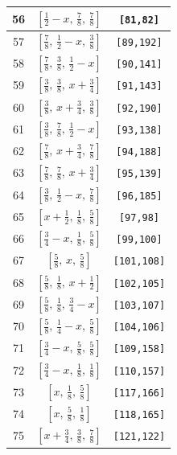 \documentclass[fleqn,8pt]{jsarticle}
\begin{document}
\begin{longtable}{ccc}
56 & $\left[ \frac{1}{2} - x,\, \frac{7}{8},\, \frac{7}{8} \right]$ & {\tt [81,82]} \\ \hline
57 & $\left[ \frac{7}{8},\, \frac{1}{2} - x,\, \frac{3}{8} \right]$ & {\tt [89,192]} \\ \hline
58 & $\left[ \frac{7}{8},\, \frac{3}{8},\, \frac{1}{2} - x \right]$ & {\tt [90,141]} \\ \hline
59 & $\left[ \frac{3}{8},\, \frac{3}{8},\, x + \frac{3}{4} \right]$ & {\tt [91,143]} \\ \hline
60 & $\left[ \frac{3}{8},\, x + \frac{3}{4},\, \frac{3}{8} \right]$ & {\tt [92,190]} \\ \hline
61 & $\left[ \frac{3}{8},\, \frac{7}{8},\, \frac{1}{2} - x \right]$ & {\tt [93,138]} \\ \hline
62 & $\left[ \frac{7}{8},\, x + \frac{3}{4},\, \frac{7}{8} \right]$ & {\tt [94,188]} \\ \hline
63 & $\left[ \frac{7}{8},\, \frac{7}{8},\, x + \frac{3}{4} \right]$ & {\tt [95,139]} \\ \hline
64 & $\left[ \frac{3}{8},\, \frac{1}{2} - x,\, \frac{7}{8} \right]$ & {\tt [96,185]} \\ \hline
65 & $\left[ x + \frac{1}{2},\, \frac{1}{8},\, \frac{5}{8} \right]$ & {\tt [97,98]} \\ \hline
66 & $\left[ \frac{3}{4} - x,\, \frac{1}{8},\, \frac{5}{8} \right]$ & {\tt [99,100]} \\ \hline
67 & $\left[ \frac{5}{8},\, x,\, \frac{5}{8} \right]$ & {\tt [101,108]} \\ \hline
68 & $\left[ \frac{5}{8},\, \frac{1}{8},\, x + \frac{1}{2} \right]$ & {\tt [102,105]} \\ \hline
69 & $\left[ \frac{5}{8},\, \frac{1}{8},\, \frac{3}{4} - x \right]$ & {\tt [103,107]} \\ \hline
70 & $\left[ \frac{5}{8},\, \frac{1}{4} - x,\, \frac{5}{8} \right]$ & {\tt [104,106]} \\ \hline
71 & $\left[ \frac{3}{4} - x,\, \frac{5}{8},\, \frac{5}{8} \right]$ & {\tt [109,158]} \\ \hline
72 & $\left[ \frac{3}{4} - x,\, \frac{1}{8},\, \frac{1}{8} \right]$ & {\tt [110,157]} \\ \hline
73 & $\left[ x,\, \frac{1}{8},\, \frac{5}{8} \right]$ & {\tt [117,166]} \\ \hline
74 & $\left[ x,\, \frac{5}{8},\, \frac{1}{8} \right]$ & {\tt [118,165]} \\ \hline
75 & $\left[ x + \frac{3}{4},\, \frac{3}{8},\, \frac{7}{8} \right]$ & {\tt [121,122]} \\ \hline

\end{longtable}
\end{document}
